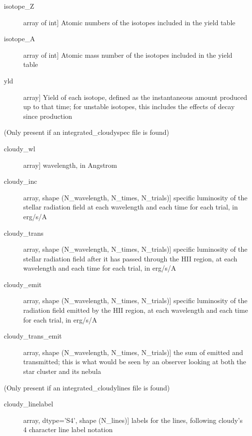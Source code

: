 \documentclass[letterpaper,10pt,english]{sphinxmanual}
\begin{document}
\begin{fulllineitems}
\begin{description}
\begin{description}
\item[{isotope\_Z}] \leavevmode{[}array of int{]}
Atomic numbers of the isotopes included in the yield table

\item[{isotope\_A}] \leavevmode{[}array of int{]}
Atomic mass number of the isotopes included in the yield table

\item[{yld}] \leavevmode{[}array{]}
Yield of each isotope, defined as the instantaneous amount
produced up to that time; for unstable isotopes, this
includes the effects of decay since production

\end{description}

(Only present if an integrated\_cloudyspec file is found)
\begin{description}
\item[{cloudy\_wl}] \leavevmode{[}array{]}
wavelength, in Angstrom

\item[{cloudy\_inc}] \leavevmode{[}array, shape (N\_wavelength, N\_times, N\_trials){]}
specific luminosity of the stellar radiation field at each
wavelength and each time for each trial, in erg/s/A

\item[{cloudy\_trans}] \leavevmode{[}array, shape (N\_wavelength, N\_times, N\_trials){]}
specific luminosity of the stellar radiation field after it has
passed through the HII region, at each wavelength and each time
for each trial, in erg/s/A

\item[{cloudy\_emit}] \leavevmode{[}array, shape (N\_wavelength, N\_times, N\_trials){]}
specific luminosity of the radiation field emitted by the HII
region, at each wavelength and each time for each trial, in
erg/s/A

\item[{cloudy\_trans\_emit}] \leavevmode{[}array, shape (N\_wavelength, N\_times, N\_trials){]}
the sum of emitted and transmitted; this is what would be seen
by an observer looking at both the star cluster and its nebula

\end{description}

(Only present if an integrated\_cloudylines file is found)
\begin{description}
\item[{cloudy\_linelabel}] \leavevmode{[}array, dtype=’S4’, shape (N\_lines){]}
labels for the lines, following cloudy’s 4 character line label
notation


\end{description}
\end{description}
\end{fulllineitems}
\end{document}
